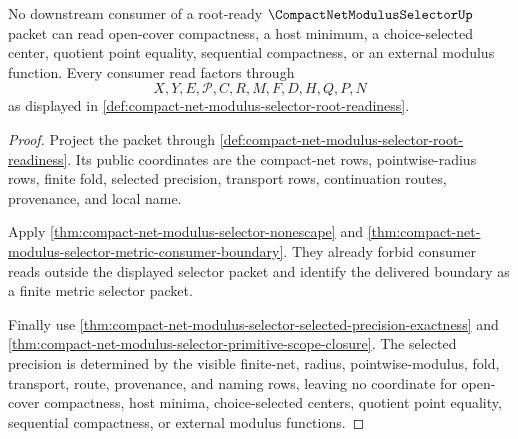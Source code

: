 \begin{theorem}
\label{thm:compact-net-modulus-selector-consumer-nonescape}
No downstream consumer of a root-ready $\CompactNetModulusSelectorUp$ packet can read open-cover compactness, a host minimum, a choice-selected center, quotient point equality, sequential compactness, or an external modulus function. Every consumer read factors through
$$
X,Y,E,\mathcal{P},C,R,M,F,D,H,Q,P,N
$$
as displayed in \autoref{def:compact-net-modulus-selector-root-readiness}.
\end{theorem}
\begin{proof}
Project the packet through \autoref{def:compact-net-modulus-selector-root-readiness}. Its public coordinates are the compact-net rows, pointwise-radius rows, finite fold, selected precision, transport rows, continuation routes, provenance, and local name.

Apply \autoref{thm:compact-net-modulus-selector-nonescape} and \autoref{thm:compact-net-modulus-selector-metric-consumer-boundary}. They already forbid consumer reads outside the displayed selector packet and identify the delivered boundary as a finite metric selector packet.

Finally use \autoref{thm:compact-net-modulus-selector-selected-precision-exactness} and \autoref{thm:compact-net-modulus-selector-primitive-scope-closure}. The selected precision is determined by the visible finite-net, radius, pointwise-modulus, fold, transport, route, provenance, and naming rows, leaving no coordinate for open-cover compactness, host minima, choice-selected centers, quotient point equality, sequential compactness, or external modulus functions.
\end{proof}

